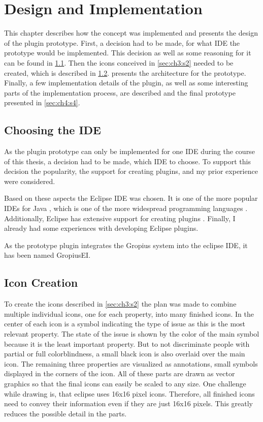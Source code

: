 
\chapter{Design and Implementation}
\label{chap:ch4}
This chapter describes how the concept was implemented and presents the design of the plugin prototype.
First, a decision had to be made, for what \gls{IDE} the prototype would be implemented.
This decision as well as some reasoning for it can be found in \cref{sec:ch4:s1}.
Then the icons conceived in \cref{sec:ch3:s2} needed to be created, which is described in \cref{sec:ch4:s2}.
 presents the architecture for the prototype.
Finally, a few implementation details of the plugin, as well as some interesting parts of the implementation process, are described 
and the final prototype presented in \cref{sec:ch4:s4}.

\section{Choosing the IDE}
\label{sec:ch4:s1}
As the plugin prototype can only be implemented for one \gls{IDE} during the course of this thesis,
a decision had to be made, which \gls{IDE} to choose.
To support this decision the popularity, the support for creating plugins, and my prior experience were considered.

Based on these aspects the Eclipse \gls{IDE} \cite{burnette2005eclipse} was chosen.
It is one of the more popular \glspl{IDE} for Java \cite{geer2005eclipse}, 
which is one of the more widespread programming languages \cite{delorey2007programming}.
Additionally, Eclipse has extensive support for creating plugins \cite{clayberg2006eclipse}.
Finally, I already had some experiences with developing Eclipse plugins.

As the prototype plugin integrates the Gropius system into the eclipse \gls{IDE}, it has been named \gls{GropiusEI}.

\section{Icon Creation}
\label{sec:ch4:s2}
To create the icons described in \cref{sec:ch3:s2} the plan was made to combine multiple individual icons, one for each property, into many finished icons.
In the center of each icon is a symbol indicating the type of issue as this is the most relevant property.
The state of the issue is shown by the color of the main symbol because it is the least important property.
But to not discriminate people with partial or full colorblindness, a small black icon is also overlaid over the main icon.
The remaining three properties are visualized as annotations, small symbols displayed in the corners of the icon.
All of these parts are drawn as vector graphics so that the final icons can easily be scaled to any size.
One challenge while drawing is, that eclipse uses 16x16 pixel icons.
Therefore, all finished icons need to convey their information even if they are just 16x16 pixels.
This greatly reduces the possible detail in the parts.

